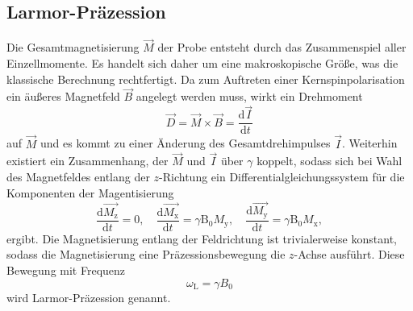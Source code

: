 \subsection{Larmor-Präzession}
Die Gesamtmagnetisierung $\vec{M}$ der Probe entsteht durch das Zusammenspiel aller
Einzellmomente. Es handelt sich daher um eine makroskopische Größe, was die klassische
Berechnung rechtfertigt.
Da zum Auftreten einer Kernspinpolarisation ein äußeres Magnetfeld $\vec{B}$ angelegt werden muss,
wirkt ein Drehmoment
\begin{equation*}
		\vec{D} = \vec{M} \times \vec{B} = \frac{\text{d} \vec{I}}{\text{d}t}
\end{equation*}
auf $\vec{M}$ und es kommt zu einer Änderung des Gesamtdrehimpulses $\vec{I}$.
Weiterhin existiert ein Zusammenhang, der $\vec{M}$ und $\vec{I}$ über $\gamma$
koppelt, sodass sich bei Wahl des Magnetfeldes entlang der $z$-Richtung ein Differentialgleichungssystem
für die Komponenten der Magentisierung
\begin{equation*}
		\frac{\text{d} \vec{M_\text{z}}}{\text{d}t} = 0 ,  \hspace{1em}
		\frac{\text{d} \vec{M_\text{x}}}{\text{d}t} = \gamma \text{B}_0
		M_\text{y}, \hspace{1em}
		\frac{\text{d} \vec{M_\text{y}}}{\text{d}t} = \gamma \text{B}_0
		M_\text{x},
\end{equation*}
ergibt.
Die Magnetisierung entlang der Feldrichtung ist trivialerweise konstant, sodass
die Magnetisierung eine Präzessionsbewegung die $z$-Achse
ausführt.
Diese Bewegung mit Frequenz
\begin{equation}
  \omega_{\text{L}} = \gamma B_{0}
\end{equation}
wird Larmor-Präzession genannt.

